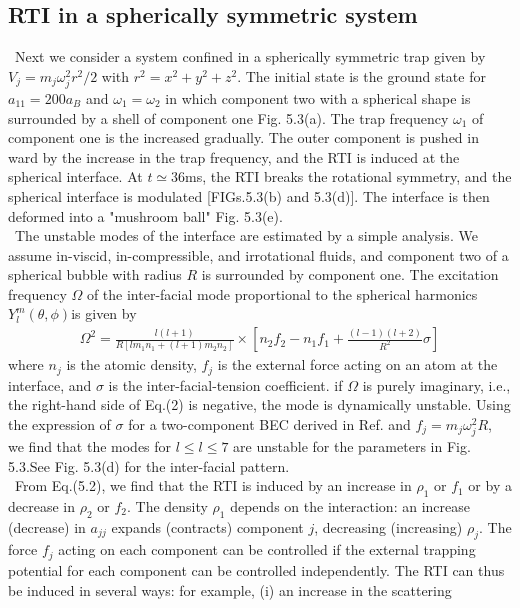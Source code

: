 \documentclass[12pt,a4paper]{report}
\begin{document}
\subsection{RTI in a spherically symmetric system}
\ Next we consider a system confined in a spherically symmetric
trap given by $V_j = m_j \omega^2_j r^2 / 2 $ with $r^2 = x^2+y^2+z^2$.
The initial state is the ground state for $a_{11}=200 a_B$ and
$\omega_1 = \omega_2$ in which component two with a spherical shape is
surrounded by a shell of component one Fig. 5.3(a). The trap
frequency $\omega_1$ of component one is the increased gradually.
The outer component is pushed in ward by the increase in the
trap frequency, and the RTI is induced at the spherical interface.
At $t \simeq 36$ms, the RTI breaks the rotational symmetry, and
the spherical interface is modulated [FIGs.5.3(b) and 5.3(d)].
The interface is then deformed into a "mushroom ball" Fig. 5.3(e).
\\
\ The unstable modes of the interface are estimated by a
simple analysis. We assume in-viscid, in-compressible, and
irrotational fluids, and component two of a spherical bubble
with radius $R$ is surrounded by component one. The excitation
frequency $\Omega$ of the inter-facial mode proportional to the
spherical harmonics $Y_l^m (\theta, \phi)$is given by \cite{73}
\begin{eqnarray}
\Omega^2 = \frac{l(l+1)}{R[lm_1 n_1 + (l+1)m_2 n_2]}
\times \left[ 
n_2 f_2 - n_1 f_1 + \frac{(l-1)(l+2)}{R^2}\sigma
\right]
\end{eqnarray}
where $n_j$ is the atomic density, $f_j$ is the external force acting
on an atom at the interface, and $\sigma$ is the inter-facial-tension
coefficient. if $\Omega$ is purely imaginary, i.e., the right-hand side of
Eq.(2) is negative, the mode is dynamically unstable. Using the
expression of $\sigma$ for a two-component BEC derived in Ref.\cite{74}
and $f_j = m_j \omega_j^2 R$, we find that the modes for $l \leq l \leq 7$ are
unstable for the parameters in Fig. 5.3.See Fig. 5.3(d) for the inter-facial pattern.
\\
\ From Eq.(5.2), we find that the RTI is induced by an
increase in $\rho_1$ or $f_1$ or by a decrease in $\rho_2$ or $f_2$. The density
$\rho_1$ depends on the interaction: an increase (decrease) in $a_{jj}$
expands (contracts) component $j$, decreasing (increasing) $\rho_{j}$.
The force $f_j$ acting on each component can be controlled if
the external trapping potential for each component can be
controlled independently. The RTI can thus be induced in
several ways: for example, (i) an increase in the scattering
\end{document}
